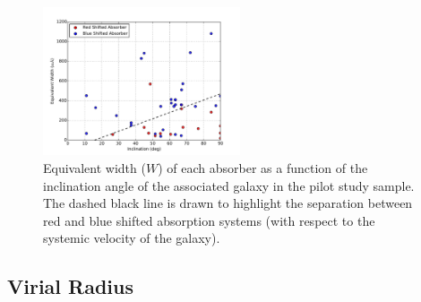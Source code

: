 \documentclass[iop]{emulateapj-rtx4}
\begin{document}
%


\begin{figure}[h!]
        \centering
        \includegraphics[width=0.52\textwidth]{W(fancy_inclination)_line_steep.pdf}
        \caption{\small{Equivalent width ($W$) of each absorber as a function of the inclination angle of the associated galaxy in the pilot study sample. The dashed black line is drawn to highlight the separation between red and blue shifted absorption systems (with respect to the systemic velocity of the galaxy).}}
        \label{ew_vs_inclination}
        \vspace{2pt}
\end{figure} 


% 
  
\subsection{Virial Radius}
\end{document}
